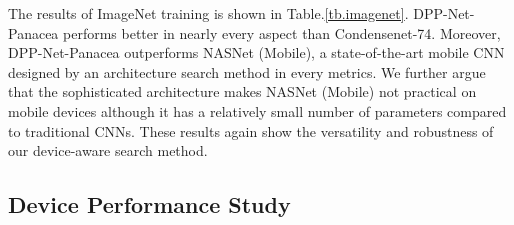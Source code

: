 \documentclass[runningheads]{llncs}
\begin{document}
The results of ImageNet training is shown in Table.\ref{tb.imagenet}. DPP-Net-Panacea performs better in nearly every aspect than Condensenet-74. Moreover, DPP-Net-Panacea outperforms NASNet (Mobile), a state-of-the-art mobile CNN designed by an architecture search method \cite{zoph2017learning} in every metrics. We further argue that the sophisticated architecture makes NASNet (Mobile) not practical on mobile devices although it has a relatively small number of parameters compared to traditional CNNs. These results again show the versatility and robustness of our device-aware search method.

\begin{table}[h]
\caption{\textbf{ImageNet Classification Results.}
Time-M and Mem-M is the inference time and memory usage of the corresponding model on our mobile phone using ONNX and Caffe2. Due to operations not supported on this framework, we cannot measure the inference time and memory usage of NASNet (Mobile) on our mobile phone}
\label{tb.imagenet}
\centering
{}
\end{table}\subsection{Device Performance Study}
\end{document}
